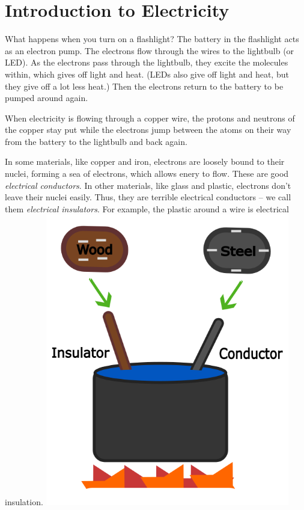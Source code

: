 \chapter{Introduction to Electricity}

What happens when you turn on a flashlight? The battery in the
flashlight acts as an electron pump. The electrons flow through the
wires to the lightbulb (or LED). As the electrons pass through the
lightbulb, they excite the molecules within, which gives off light and
heat. (LEDs also give off light and heat, but they give off a lot less
heat.) Then the electrons return to the battery to be pumped around
again.

When electricity is flowing through a copper wire, the protons and
neutrons of the copper stay put while the electrons jump between the
atoms on their way from the battery to the lightbulb and back again.

In some materials, like copper and iron, electrons are loosely bound
to their nuclei, forming a sea of electrons, which allows enery to flow. These are good \textit{electrical conductors}. In
other materials, like glass and plastic, electrons don't leave their
nuclei easily. Thus, they are terrible electrical conductors -- we call
them \textit{electrical insulators}. For example, the plastic around a
wire is electrical insulation.
\includegraphics[width=0.8\textwidth]{Insulator_vs_Conductor.png}


